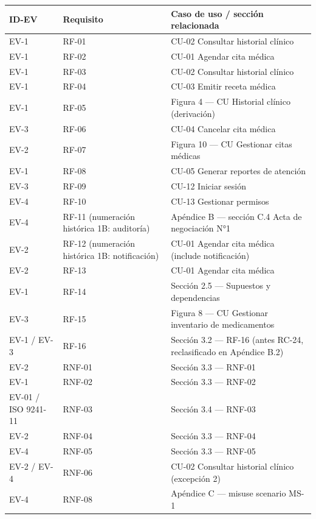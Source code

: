 \documentclass[11pt,a4paper]{article}
\begin{document}
	\begin{longtable}{p{} p{} p{}}
		
		\toprule
		\textbf{ID-EV} &
		\textbf{Requisito} &
		\textbf{Caso de uso / sección relacionada} \\
		\midrule
		\endhead
		
		\bottomrule
		\endlastfoot
		EV-1 & RF-01 & CU-02 Consultar historial clínico \\
		EV-1 & RF-02 & CU-01 Agendar cita médica \\
		EV-1 & RF-03 & CU-02 Consultar historial clínico \\
		EV-1 & RF-04 & CU-03 Emitir receta médica \\
		EV-1 & RF-05 & Figura 4 --- CU Historial clínico (derivación) \\
		EV-3 & RF-06 & CU-04 Cancelar cita médica \\
		EV-2 & RF-07 & Figura 10 --- CU Gestionar citas médicas \\
		EV-1 & RF-08 & CU-05 Generar reportes de atención \\
		EV-3 & RF-09 & CU-12 Iniciar sesión \\
		EV-4 & RF-10 & CU-13 Gestionar permisos \\
		EV-4 & RF-11 (numeración histórica 1B: auditoría) & Apéndice B --- sección C.4 Acta de negociación N°1 \\
		EV-2 & RF-12 (numeración histórica 1B: notificación) & CU-01 Agendar cita médica (include notificación) \\
		EV-2 & RF-13 & CU-01 Agendar cita médica \\
		EV-1 & RF-14 & Sección 2.5 --- Supuestos y dependencias \\
		EV-3 & RF-15 & Figura 8 --- CU Gestionar inventario de medicamentos \\
		EV-1 / EV-3 & RF-16 & Sección 3.2 --- RF-16 (antes RC-24, reclasificado en Apéndice B.2) \\
		EV-2 & RNF-01 & Sección 3.3 --- RNF-01 \\
		EV-1 & RNF-02 & Sección 3.3 --- RNF-02 \\
		EV-01 / ISO 9241-11 & RNF-03 & Sección 3.4 --- RNF-03 \\
		EV-2 & RNF-04 & Sección 3.3 --- RNF-04 \\
		EV-4 & RNF-05 & Sección 3.3 --- RNF-05 \\
		EV-2 / EV-4 & RNF-06 & CU-02 Consultar historial clínico (excepción 2) \\
		EV-4 & RNF-08 & Apéndice C --- misuse scenario MS-1 \\
	\end{longtable}
	
\end{document}
